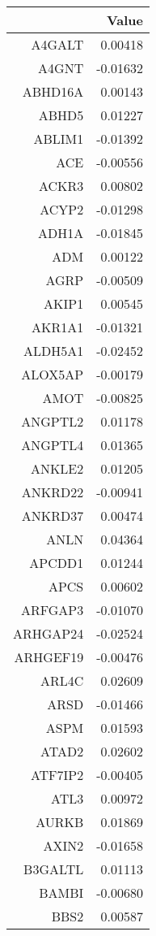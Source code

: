 \begin{longtable}{rr}
  \hline
 & Value \\ 
  \hline
A4GALT & 0.00418 \\ 
  A4GNT & -0.01632 \\ 
  ABHD16A & 0.00143 \\ 
  ABHD5 & 0.01227 \\ 
  ABLIM1 & -0.01392 \\ 
  ACE & -0.00556 \\ 
  ACKR3 & 0.00802 \\ 
  ACYP2 & -0.01298 \\ 
  ADH1A & -0.01845 \\ 
  ADM & 0.00122 \\ 
  AGRP & -0.00509 \\ 
  AKIP1 & 0.00545 \\ 
  AKR1A1 & -0.01321 \\ 
  ALDH5A1 & -0.02452 \\ 
  ALOX5AP & -0.00179 \\ 
  AMOT & -0.00825 \\ 
  ANGPTL2 & 0.01178 \\ 
  ANGPTL4 & 0.01365 \\ 
  ANKLE2 & 0.01205 \\ 
  ANKRD22 & -0.00941 \\ 
  ANKRD37 & 0.00474 \\ 
  ANLN & 0.04364 \\ 
  APCDD1 & 0.01244 \\ 
  APCS & 0.00602 \\ 
  ARFGAP3 & -0.01070 \\ 
  ARHGAP24 & -0.02524 \\ 
  ARHGEF19 & -0.00476 \\ 
  ARL4C & 0.02609 \\ 
  ARSD & -0.01466 \\ 
  ASPM & 0.01593 \\ 
  ATAD2 & 0.02602 \\ 
  ATF7IP2 & -0.00405 \\ 
  ATL3 & 0.00972 \\ 
  AURKB & 0.01869 \\ 
  AXIN2 & -0.01658 \\ 
  B3GALTL & 0.01113 \\ 
  BAMBI & -0.00680 \\ 
  BBS2 & 0.00587 \\ 

\end{longtable}
